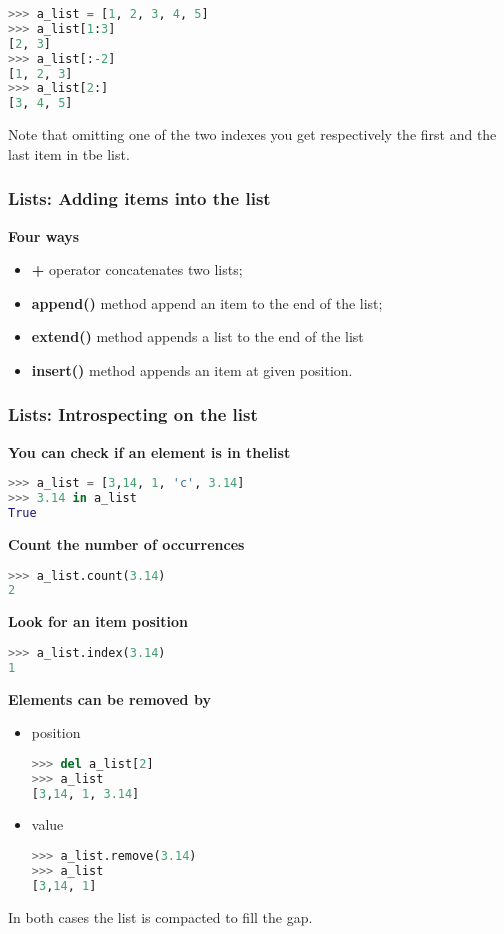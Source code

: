 \begin{lstlisting}[language=Python]
>>> a_list = [1, 2, 3, 4, 5]
>>> a_list[1:3]
[2, 3]
>>> a_list[:-2]
[1, 2, 3]
>>> a_list[2:]
[3, 4, 5]
\end{lstlisting}

Note that omitting one of the two indexes you get respectively the first and the last item in tbe list.

\subsubsection{Lists: Adding items into the list}
\textbf{Four ways}
\begin{itemize}
	\item \textbf{+} operator concatenates two lists;
	\item \textbf{append()} method append an item to the end of the list;
	\item \textbf{extend()} method appends a list to the end of the list
	\item \textbf{insert()} method appends an item at given position.
\end{itemize}

\subsubsection{Lists: Introspecting on the list}
\textbf{You can check if an element is in thelist}
\begin{lstlisting}[language=Python]
>>> a_list = [3,14, 1, 'c', 3.14]
>>> 3.14 in a_list
True
\end{lstlisting}
\textbf{Count the number of occurrences}
\begin{lstlisting}[language=Python]
>>> a_list.count(3.14)
2
\end{lstlisting}
\textbf{Look for an item position}
\begin{lstlisting}[language=Python]
>>> a_list.index(3.14)
1
\end{lstlisting}
\textbf{Elements can be removed by}
\begin{itemize}
	\item position
\begin{lstlisting}[language=Python]
>>> del a_list[2]
>>> a_list
[3,14, 1, 3.14]
\end{lstlisting}
	\item value
\begin{lstlisting}[language=Python]
>>> a_list.remove(3.14)
>>> a_list
[3,14, 1]
\end{lstlisting}
\end{itemize}
In both cases the list is compacted to fill the gap.

